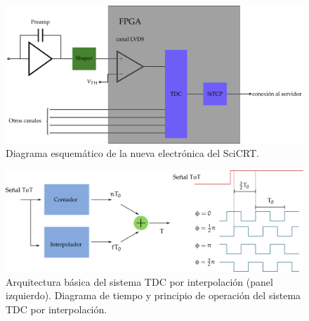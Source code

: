 \begin{figure}
        \centering
        \includegraphics[width=\textwidth]{nfeb-prot.pdf}
        \caption{Diagrama esquemático de la nueva electrónica del SciCRT.}
        \label{fig:nfeb-prot}
\end{figure}


\begin{figure}
        \centering
        \includegraphics[width=\textwidth]{tdc-diagram.pdf}
        \caption{Arquitectura básica del sistema TDC por interpolación (panel izquierdo). Diagrama de tiempo y principio de operación del sistema TDC por interpolación.}
        \label{fig:tdc-diagram}
\end{figure}
